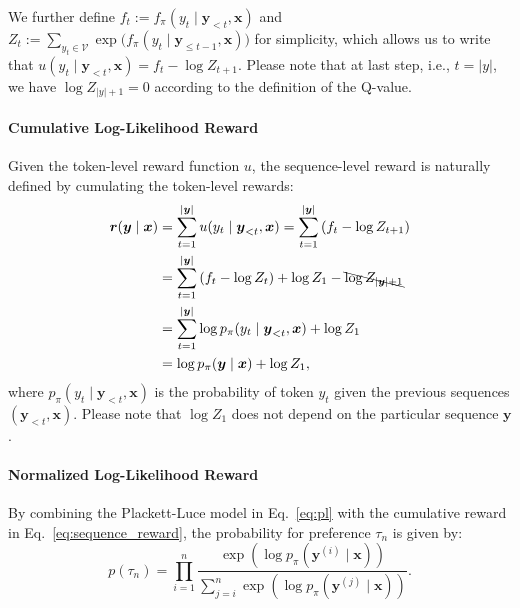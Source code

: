 We further define $f_t := f_\pi(y_t \mid \boldsymbol{y}_{<t}, \boldsymbol{x})$ and $Z_t := \sum_{y_t \in \mathcal{V}} \exp\bigl(f_\pi(y_t \mid \boldsymbol{y}_{\leq t-1},  \boldsymbol{x})\bigr)$ for simplicity, which allows us to write that $u(y_t \mid \boldsymbol{y}_{<t}, \boldsymbol{x}) = f_t - \log Z_{t+1}$. Please note that at last step, i.e., $t=|y|$, we have $\log Z_{|y|+1} = 0$ according to the definition of the Q-value.

\paragraph{Cumulative Log-Likelihood Reward}
Given the token-level reward function $u$, the sequence-level reward is naturally defined by cumulating the token-level rewards:
\begin{align}
\label{eq:sequence_reward}
    \boldsymbol{r}(\boldsymbol{y} \mid \boldsymbol{x}) &= \sum_{t=1}^{|\boldsymbol{y}|} u(y_t \mid \boldsymbol{y}_{<t}, \boldsymbol{x}) = \sum_{t=1}^{|\boldsymbol{y}|} \left(f_t - \log Z_{t+1}\right) \notag \\
    &= \sum_{t=1}^{|\boldsymbol{y}|} \left(f_t - \log Z_t\right) + \log Z_1 - \bcancel{\log Z_{|\boldsymbol{y}|+1}} \notag \\
    &= \sum_{t=1}^{|\boldsymbol{y}|} \log p_\pi(y_t \mid \boldsymbol{y}_{<t}, \boldsymbol{x}) + \log Z_1 \notag \\
    &= \log p_\pi(\boldsymbol{y} \mid \boldsymbol{x}) + \log Z_1,
\end{align}
where $p_\pi(y_t \mid \boldsymbol{y}_{<t}, \boldsymbol{x})$ is the probability of token $y_t$ given the previous sequences $(\boldsymbol{y}_{<t}, \boldsymbol{x})$. Please note that $\log Z_1$ does not depend on the particular sequence $\boldsymbol{y}$.

\paragraph{Normalized Log-Likelihood Reward}
By combining the Plackett-Luce model in Eq.~\ref{eq:pl} with the cumulative reward in Eq.~\ref{eq:sequence_reward}, the probability for preference $\tau_n$ is given by:
\begin{equation}
\label{eq:pref_modeling}
    p(\tau_n) = \prod_{i=1}^{n} \frac{\exp \left(\log p_\pi(\boldsymbol{y}^{(i)} \mid \boldsymbol{x})\right)}{\sum_{j=i}^{n} \exp \left(\log p_\pi(\boldsymbol{y}^{(j)} \mid \boldsymbol{x}) \right)}.
\end{equation}

